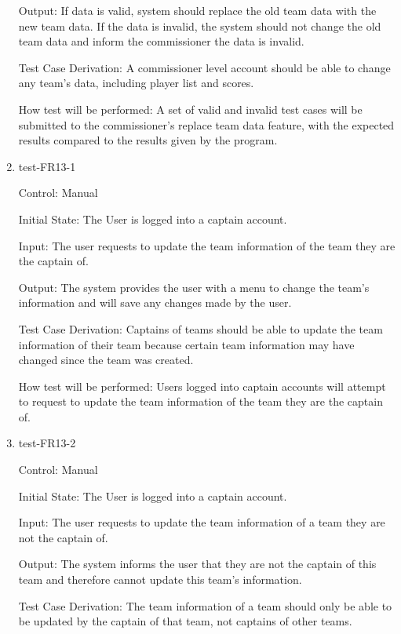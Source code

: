\documentclass[12pt, titlepage]{article}
\begin{document}
\begin{enumerate}
  Output: If data is valid, system should replace the old team data with the new
  team data. If the data is invalid, the system should not change the old team
  data and inform the commissioner the data is invalid.

  Test Case Derivation: A commissioner level account should be able to change
  any team's data, including player list and scores.

  How test will be performed: A set of valid and invalid test cases will be
  submitted to the commissioner's replace team data feature, with the expected
  results compared to the results given by the program.

  \item{test-FR13-1\\}

  Control: Manual
           
  Initial State: The User is logged into a captain account.
           
  Input: The user requests to update the team information of the team they are
  the captain of.
           
  Output: The system provides the user with a menu to change the team's
  information and will save any changes made by the user.
 
  Test Case Derivation: Captains of teams should be able to update the team
  information of their team because certain team information may have changed
  since the team was created.
 
  How test will be performed: Users logged into captain accounts will attempt
  to request to update the team information of the team they are the captain of.

  \item{test-FR13-2\\}

  Control: Manual
           
  Initial State: The User is logged into a captain account.
           
  Input: The user requests to update the team information of a team they are
  not the captain of.
           
  Output: The system informs the user that they are not the captain of this team
  and therefore cannot update this team's information.
 
  Test Case Derivation: The team information of a team should only be able to be
  updated by the captain of that team, not captains of other teams.
 

\end{enumerate}
\end{document}
